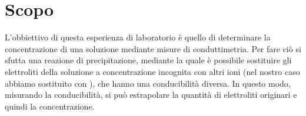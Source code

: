 \section*{Scopo}

L'obbiettivo di questa esperienza di laboratorio è quello di determinare la concentrazione
di una soluzione mediante misure di conduttimetria. Per fare ciò si sfutta una reazione di
precipitazione, mediante la quale è possibile sostituire gli elettroliti della soluzione
a concentrazione incognita con altri ioni (nel nostro caso abbiamo sostituito  con ),
che hanno una conducibilità diversa. In questo modo, misurando la conducibilità, si può
estrapolare la quantità di elettroliti originari e quindi la concentrazione.
